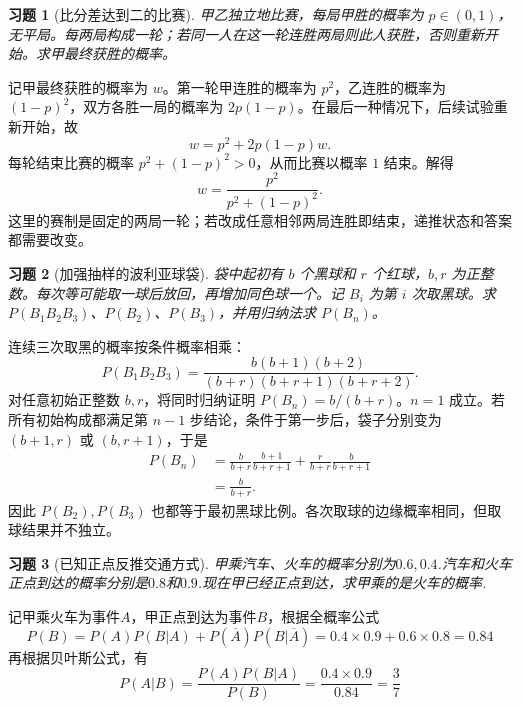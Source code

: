 \documentclass[12pt,fontset=fandol]{ctexart}
\newtheorem{exercise}{习题}[section]
\begin{document}
\begin{exercise}[比分差达到二的比赛]\label{q:Y2.19}
甲乙独立地比赛，每局甲胜的概率为 $p\in(0,1)$，无平局。每两局构成一轮；若同一人在这一轮连胜两局则此人获胜，否则重新开始。求甲最终获胜的概率。\par{}
\end{exercise}

\begin{solve}\label{a:Y2.19}记甲最终获胜的概率为 $w$。第一轮甲连胜的概率为 $p^2$，乙连胜的概率为 $(1-p)^2$，双方各胜一局的概率为 $2p(1-p)$。在最后一种情况下，后续试验重新开始，故\[w=p^2+2p(1-p)w.\]每轮结束比赛的概率 $p^2+(1-p)^2>0$，从而比赛以概率 $1$ 结束。解得\[w=\frac{p^2}{p^2+(1-p)^2}.\]这里的赛制是固定的两局一轮；若改成任意相邻两局连胜即结束，递推状态和答案都需要改变。\end{solve}

\begin{exercise}[加强抽样的波利亚球袋]\label{q:Y2.20}
袋中起初有 $b$ 个黑球和 $r$ 个红球，$b,r$ 为正整数。每次等可能取一球后放回，再增加同色球一个。记 $B_i$ 为第 $i$ 次取黑球。求 $P(B_1B_2B_3)$、$P(B_2)$、$P(B_3)$，并用归纳法求 $P(B_n)$。\par{}
\end{exercise}

\begin{solve}\label{a:Y2.20}连续三次取黑的概率按条件概率相乘：\[P(B_1B_2B_3)=\frac{b(b+1)(b+2)}{(b+r)(b+r+1)(b+r+2)}.\]对任意初始正整数 $b,r$，将同时归纳证明 $P(B_n)=b/(b+r)$。$n=1$ 成立。若所有初始构成都满足第 $n-1$ 步结论，条件于第一步后，袋子分别变为 $(b+1,r)$ 或 $(b,r+1)$，于是\[\begin{aligned}P(B_n)&=\frac{b}{b+r}\frac{b+1}{b+r+1}+\frac{r}{b+r}\frac{b}{b+r+1}\\&=\frac{b}{b+r}.\end{aligned}\]因此 $P(B_2),P(B_3)$ 也都等于最初黑球比例。各次取球的边缘概率相同，但取球结果并不独立。\end{solve}

\begin{exercise}[已知正点反推交通方式]\label{q:Y2.21}
甲乘汽车、火车的概率分别为$0.6,0.4$.汽车和火车正点到达的概率分别是$0.8$和$0.9$.现在甲已经正点到达，求甲乘的是火车的概率.\par{}
\end{exercise}

\begin{solve}\label{a:Y2.21}
记甲乘火车为事件$A$，甲正点到达为事件$B$，根据全概率公式
\[P(B) = P(A)P(B|A) + P(\overline A )P(B|\overline A ) = 0.4 \times 0.9 + 0.6 \times 0.8 = 0.84\]
再根据贝叶斯公式，有
\[P(A|B) = \frac{{P(A)P(B|A)}}{{P(B)}} = \frac{{0.4 \times 0.9}}{{0.84}} = \frac{3}{7}\]
\end{solve}
\end{document}
